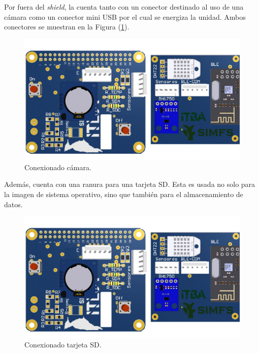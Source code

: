 Por fuera del \textit{shield}, la \rspi cuenta tanto con un conector destinado al uso de una cámara como un conector mini USB por el cual se energiza la unidad. Ambos conectores se muestran en la Figura (\ref{fig:rpiFront}).
\begin{figure}[H]
	\centering
	\includegraphics[width=\linewidth,page=3]{ImagenesIngenieria de Detalle/RPI}		
	\caption{Conexionado cámara.}
	\label{fig:rpiFront}
\end{figure}

Además, cuenta con una ranura para una tarjeta SD. Esta es usada no solo para la imagen de sistema operativo, sino que también para el almacenamiento de datos.
\begin{figure}[H]
	\centering
	\includegraphics[width=0.9\linewidth,page=2]{ImagenesIngenieria de Detalle/RPI}		
	\caption{Conexionado tarjeta SD.}
	\label{fig:rpiBack}
\end{figure}
